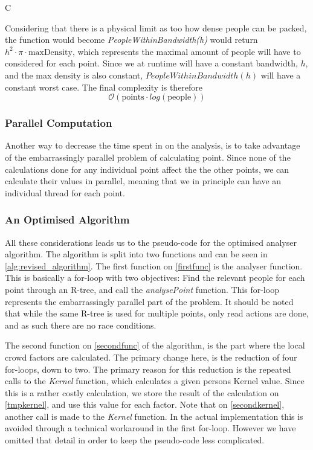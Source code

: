 C

Considering that there is a physical limit as too how dense people can be packed, the function would become \emph{PeopleWithinBandwidth(h)} would return $h^2 \cdot \pi \cdot \text{maxDensity}$, which represents the maximal amount of people will have to considered for each point. Since we at runtime will have a constant bandwidth, $h$, and the max density is also constant, $PeopleWithinBandwidth(h)$ will have a constant worst case. The final complexity is therefore $$\mathcal{O}(\text{points} \cdot log(\text{people}))$$

\subsubsection{Parallel Computation}

Another way to decrease the time spent in on the analysis, is to take advantage of the embarrassingly parallel problem of calculating point. Since none of the calculations done for any individual point affect the the other points, we can calculate their values in parallel, meaning that we in principle can have an individual thread for each point.

\subsubsection{An Optimised Algorithm}
All these considerations leads us to the pseudo-code for the optimised analyser algorithm. The algorithm is split into two functions and can be seen in \cref{alg:revised_algorithm}. The first function on \cref{firstfunc} is the analyser function. This is basically a for-loop with two objectives: Find the relevant people for each point through an R-tree, and call the \emph{analysePoint} function. This for-loop represents the embarrassingly parallel part of the problem. It should be noted that while the same R-tree is used for multiple points, only read actions are done, and as such there are no race conditions.

The second function on \cref{secondfunc} of the algorithm, is the part where the local crowd factors are calculated. The primary change here, is the reduction of four for-loops, down to two. The primary reason for this reduction is the repeated calls to the \emph{Kernel} function, which calculates a given persons Kernel value. Since this is a rather costly calculation, we store the result of the calculation on \cref{tmpkernel}, and use this value for each factor. Note that on \cref{secondkernel}, another call is made to the \emph{Kernel} function. In the actual implementation this is avoided through a technical workaround in the first for-loop. However we have omitted that detail in order to keep the pseudo-code less complicated.

